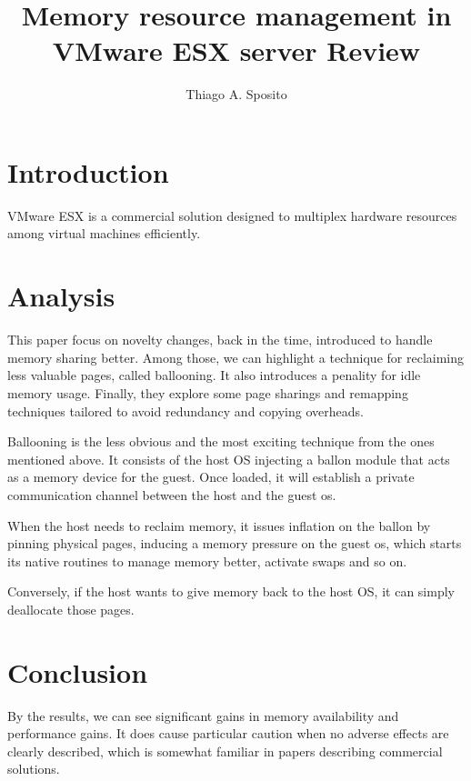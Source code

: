\documentclass[12pt]{article}
\title{Memory resource management in VMware ESX server Review}
\author{Thiago A. Sposito\inst{1} }
\begin{document}
 

\maketitle


\section{Introduction}
VMware ESX is a commercial solution designed to multiplex hardware resources among virtual machines efficiently. \cite{waldspurger2002memory}
\section{Analysis}
This paper focus on novelty changes, back in the time, introduced to handle memory sharing better. Among those, we can highlight a technique for reclaiming less valuable pages, called ballooning. It also introduces a penality for idle memory usage. Finally, they explore some page sharings and remapping techniques tailored to avoid redundancy and copying overheads.

Ballooning is the less obvious and the most exciting technique from the ones mentioned above. It consists of the host OS injecting a ballon module that acts as a memory device for the guest. Once loaded, it will establish a private communication channel between the host and the guest os.

When the host needs to reclaim memory, it issues inflation on the ballon by pinning physical pages, inducing a memory pressure on the guest os, which starts its native routines to manage memory better, activate swaps and so on.

Conversely, if the host wants to give memory back to the host OS, it can simply deallocate those pages.

\section{Conclusion}
By the results, we can see significant gains in memory availability and performance gains. It does cause particular caution when no adverse effects are clearly described, which is somewhat familiar in papers describing commercial solutions.



\end{document}
